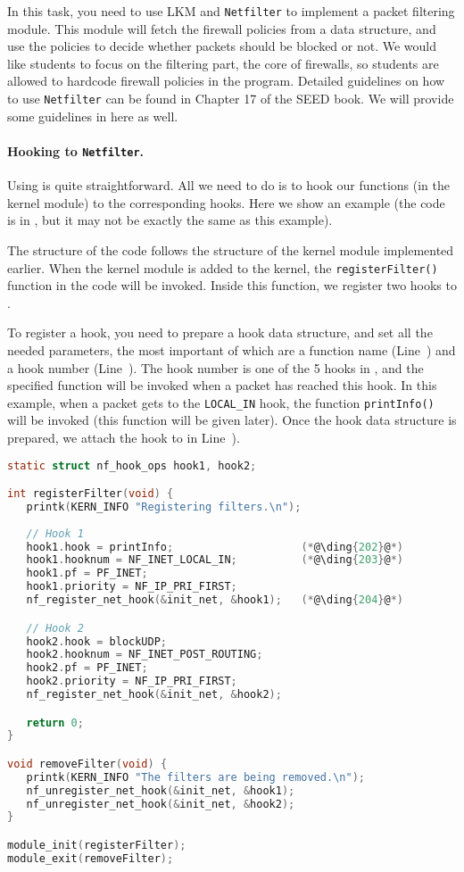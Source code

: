 In this task, you need to use LKM and {\tt Netfilter} to implement
a packet filtering module.  This module will fetch 
the firewall policies from a data structure, and use the 
policies to decide whether packets should be blocked or not.
We would like students to focus on the filtering part, 
the core of firewalls, so students are allowed to hardcode firewall policies 
in the program.  Detailed guidelines on how to use \texttt{Netfilter} can be 
found in Chapter 17 of the SEED book. We will provide 
some guidelines in here as well.


\paragraph{Hooking to \texttt{Netfilter}.} 
Using \netfilter is quite straightforward. All we need to do
is to hook our functions (in the kernel module) to the corresponding
\netfilter hooks. Here we show an example (the code is in
, but it may not be exactly the same as 
this example).

The structure of the code follows the structure of the kernel module 
implemented earlier. When the kernel module is added to the 
kernel, the \texttt{registerFilter()} function in the code will be 
invoked. Inside this function, we register two hooks 
to \netfilter. 

To register a hook, you need to prepare a hook data structure, 
and set all the needed parameters, the most important of which
are a function name (Line~) and a hook number (Line~). 
The hook number is one of the 
5 hooks in \netfilter, and the specified function will be 
invoked when a packet has reached this hook. In this example,
when a packet gets to the \texttt{LOCAL\_IN} hook,  the 
function \texttt{printInfo()} will be invoked (this function
will be given later). Once the hook data structure is prepared,
we attach the hook to \netfilter in Line~).


\begin{lstlisting}[language=C, caption={Register hook functions to \netfilter}]
static struct nf_hook_ops hook1, hook2;

int registerFilter(void) {
   printk(KERN_INFO "Registering filters.\n");
   
   // Hook 1
   hook1.hook = printInfo;                    (*@\ding{202}@*)
   hook1.hooknum = NF_INET_LOCAL_IN;          (*@\ding{203}@*)
   hook1.pf = PF_INET;
   hook1.priority = NF_IP_PRI_FIRST;
   nf_register_net_hook(&init_net, &hook1);   (*@\ding{204}@*)

   // Hook 2
   hook2.hook = blockUDP;
   hook2.hooknum = NF_INET_POST_ROUTING;
   hook2.pf = PF_INET;
   hook2.priority = NF_IP_PRI_FIRST;
   nf_register_net_hook(&init_net, &hook2);

   return 0;
}

void removeFilter(void) {
   printk(KERN_INFO "The filters are being removed.\n");
   nf_unregister_net_hook(&init_net, &hook1);
   nf_unregister_net_hook(&init_net, &hook2);
}

module_init(registerFilter);
module_exit(removeFilter);
\end{lstlisting}

